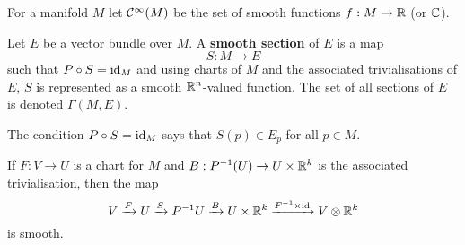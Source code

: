 For a manifold $M$ let $\mathcal{C}^\infty(M)$ be the set of smooth functions $f: M \to \mathbb{R}$ (or $\mathbb{C}$).

\begin{defn}
  Let $E$ be a vector bundle over $M$.
  A \textbf{smooth section} of $E$ is a map
  \[ S: M \to E \]
  such that $P \circ S = \operatorname{id}_M$ and using charts of $M$ and the associated trivialisations of $E$, $S$ is represented as a smooth $\mathbb{R}^n$-valued function.
  The set of all sections of $E$ is denoted $\Gamma(M,E)$.
\end{defn}

\begin{rmk}
  \lv
  \begin{enum}
    \io
    The condition $P \circ S = \operatorname{id}_M$ says that $S(p) \in E_p$ for all $p \in M$.

    \io
    If $F: V \to U$ is a chart for $M$ and $B: P^{-1}(U) \to U \times \mathbb{R}^k$ is the associated trivialisation, then the map
    \[ V \xrightarrow{F} U \xrightarrow{S} P^{-1} U \xrightarrow{B} U \times \mathbb{R}^k \xrightarrow{F^{-1} \times \operatorname{id}} V \otimes \mathbb{R}^k \]
    is smooth.
  \end{enum}
\end{rmk}
